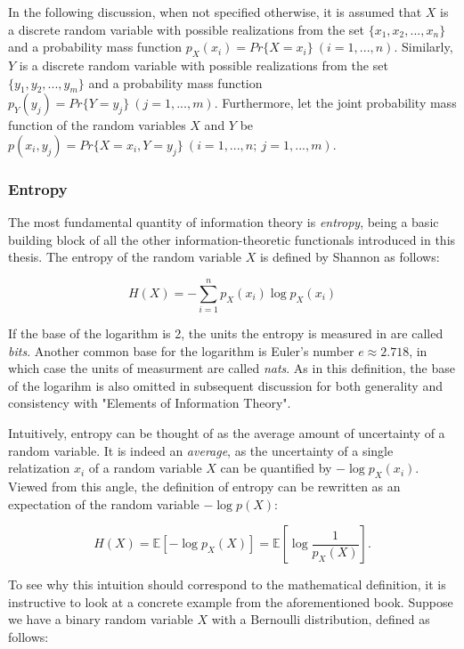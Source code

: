 \documentclass[12pt]{article}
\begin{document}
In the following discussion, when not specified otherwise, it is assumed that $X$ is a discrete random variable with possible realizations from the set $\{x_1, x_2, ..., x_n\}$ and a probability mass function $p_X(x_i) = Pr\{X = x_i\} \ (i = 1, ..., n)$. Similarly, $Y$ is a discrete random variable with possible realizations from the set $\{y_1, y_2, ..., y_m\}$ and a probability mass function $p_Y(y_j) = Pr\{Y = y_j\} \ (j = 1, ..., m)$. Furthermore, let the joint probability mass function of the random variables $X$ and $Y$ be $p(x_i, y_j) = Pr\{X = x_i, Y = y_j\} \ (i = 1, ..., n; \ j = 1, ..., m)$. 

\subsubsection{Entropy}

The most fundamental quantity of information theory is \textit{entropy}, being a basic building block of all the other information-theoretic functionals introduced in this thesis. The entropy of the random variable $X$ is defined by Shannon \cite{shannon} as follows: 

\begin{equation}
H(X) = -\sum_{i=1}^{n} p_X(x_i) \log p_X(x_i)
\label{eq:entropy}
\end{equation}

If the base of the logarithm is 2, the units the entropy is measured in are called \textit{bits}. Another common base for the logarithm is Euler's number $e \approx 2.718$, in which case the units of measurment are called \textit{nats}. As in this definition, the base of the logarihm is also omitted in subsequent discussion for both generality and consistency with "Elements of Information Theory".

Intuitively, entropy can be thought of as the average amount of uncertainty of a random variable. It is indeed an \textit{average}, as the uncertainty of a single relatization $x_i$ of a random variable $X$ can be quantified by $-\log p_X(x_i)$. Viewed from this angle, the definition of entropy can be rewritten as an expectation of the random variable $-\log p(X)$: 

$$H(X) = \mathbb{E} \left[ - \log p_X(X) \right] = \mathbb{E} \left[ \log \frac{1}{p_X(X)} \right].$$

To see why this intuition should correspond to the mathematical definition, it is instructive to look at a concrete example from the aforementioned book. Suppose we have a binary random variable $X$ with a Bernoulli distribution, defined as follows: 
\end{document}
